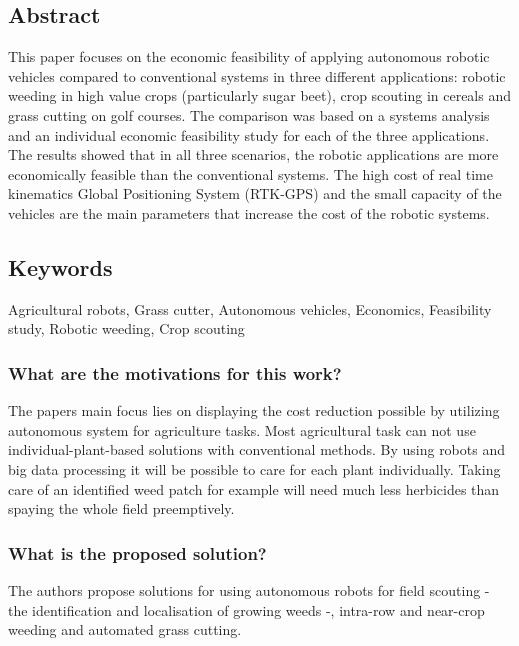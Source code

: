     \subsection*{Abstract}
    This  paper focuses  on  the  economic  feasibility of  applying  autonomous robotic  vehicles  compared  to  conventional  systems  in  three  different  applications: robotic weeding in high value crops (particularly sugar beet), crop scouting in cereals and grass cutting on golf courses. The comparison was based on a systems analysis and an individual economic feasibility study for each of the three applications. The results  showed  that  in  all  three  scenarios,  the  robotic  applications  are  more  economically feasible than the conventional systems. The high cost of real time kinematics Global Positioning System (RTK-GPS) and the small capacity of the vehicles are the main parameters that increase the cost of the robotic systems.
    
    \subsection*{Keywords}
    Agricultural robots, Grass cutter, Autonomous vehicles, Economics, Feasibility study, Robotic weeding, Crop scouting
    
     
    
    \subsubsection*{What are the motivations for this work?}
    The papers main focus lies on displaying the cost reduction possible by utilizing 
    autonomous system for agriculture tasks. Most agricultural task can not use individual-plant-based solutions with
    conventional methods. By using robots and big data processing it will be possible to care for each plant individually.
    Taking care of an identified weed patch for example will need much less herbicides than spaying the whole field preemptively.
    \subsubsection*{What is the proposed solution?}
    The authors propose solutions for using autonomous robots for field scouting - the identification and localisation 
    of growing weeds -, intra-row and near-crop weeding and automated grass cutting. 
